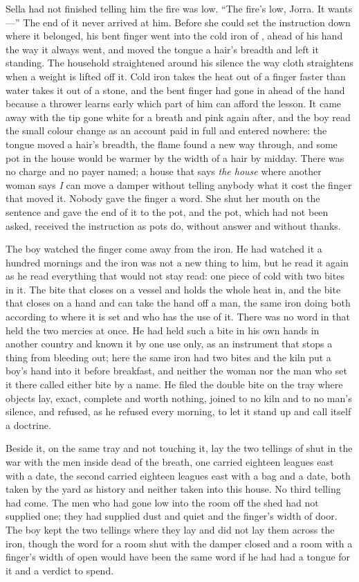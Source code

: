 Sella had not finished telling him the fire was low. “The fire's low, Jorra. It wants---” The end of it never arrived at him. Before she could set the instruction down where it belonged, his bent finger went into the cold iron of , ahead of his hand the way it always went, and moved the tongue a hair's breadth and left it standing. The household straightened around his silence the way cloth straightens when a weight is lifted off it. Cold iron takes the heat out of a finger faster than water takes it out of a stone, and the bent finger had gone in ahead of the hand because a thrower learns early which part of him can afford the lesson. It came away with the tip gone white for a breath and pink again after, and the boy read the small colour change as an account paid in full and entered nowhere: the tongue moved a hair's breadth, the flame found a new way through, and some pot in the house would be warmer by the width of a hair by midday. There was no charge and no payer named; a house that says \emph{the house} where another woman says \emph{I} can move a damper without telling anybody what it cost the finger that moved it. Nobody gave the finger a word. She shut her mouth on the sentence and gave the end of it to the pot, and the pot, which had not been asked, received the instruction as pots do, without answer and without thanks.

The boy watched the finger come away from the iron. He had watched it a hundred mornings and the iron was not a new thing to him, but he read it again as he read everything that would not stay read: one piece of cold with two bites in it. The bite that closes on a vessel and holds the whole heat in, and the bite that closes on a hand and can take the hand off a man, the same iron doing both according to where it is set and who has the use of it. There was no word in  that held the two mercies at once. He had held such a bite in his own hands in another country and known it by one use only, as an instrument that stops a thing from bleeding out; here the same iron had two bites and the kiln put a boy's hand into it before breakfast, and neither the woman nor the man who set it there called either bite by a name. He filed the double bite on the tray where objects lay, exact, complete and worth nothing, joined to no kiln and to no man's silence, and refused, as he refused every morning, to let it stand up and call itself a doctrine.

Beside it, on the same tray and not touching it, lay the two tellings of  shut in the war with the men inside dead of the breath, one carried eighteen leagues east with a date, the second carried eighteen leagues east with a bag and a date, both taken by the yard as history and neither taken into this house. No third telling had come. The men who had gone low into the room off the shed had not supplied one; they had supplied dust and quiet and the finger's width of door. The boy kept the two tellings where they lay and did not lay them across the iron, though the word for a room shut with the damper closed and a room with a finger's width of open would have been the same word if he had had a tongue for it and a verdict to spend.

